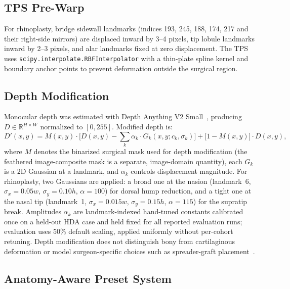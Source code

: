 \documentclass{article}
\begin{document}
\subsection{TPS Pre-Warp}

For rhinoplasty, bridge sidewall landmarks (indices 193, 245, 188, 174, 217 and
their right-side mirrors) are displaced inward by 3--4 pixels, tip lobule
landmarks inward by 2--3 pixels, and alar landmarks fixed at zero displacement.
The TPS uses \texttt{scipy.interpolate.RBFInterpolator} with a thin-plate
spline kernel and boundary anchor points to prevent deformation outside the
surgical region.

\subsection{Depth Modification}

Monocular depth was estimated with Depth Anything V2 Small~\citep{yang2024depth},
producing $D \in \mathbb{R}^{H \times W}$ normalized to $[0,255]$. Modified
depth is:
\begin{equation}
D'(x,y) = M(x,y) \cdot \bigl[D(x,y) - \textstyle\sum_k \alpha_k \cdot
G_k(x,y; c_k, \sigma_k)\bigr]
+ \bigl[1 - M(x,y)\bigr] \cdot D(x,y),
\label{eq:depth_mod}
\end{equation}
where $M$ denotes the binarized surgical mask used for depth modification (the feathered image-composite mask is a separate, image-domain quantity),
each $G_k$ is a 2D Gaussian at a landmark, and $\alpha_k$ controls
displacement magnitude. For rhinoplasty, two Gaussians are applied: a broad
one at the nasion (landmark~6, $\sigma_x{=}0.05w$, $\sigma_y{=}0.10h$,
$\alpha{=}100$) for dorsal hump reduction, and a tight one at the nasal tip
(landmark~1, $\sigma_x{=}0.015w$, $\sigma_y{=}0.15h$, $\alpha{=}115$) for
the supratip break. Amplitudes $\alpha_k$ are landmark-indexed hand-tuned constants
calibrated once on a held-out HDA case and held fixed for all reported evaluation runs;
evaluation uses 50\% default scaling, applied uniformly without per-cohort retuning. Depth modification does not distinguish
bony from cartilaginous deformation or model surgeon-specific choices such
as spreader-graft placement~\citep{daniel2010mastering}.

\subsection{Anatomy-Aware Preset System}
\label{sec:presets}
\end{document}
